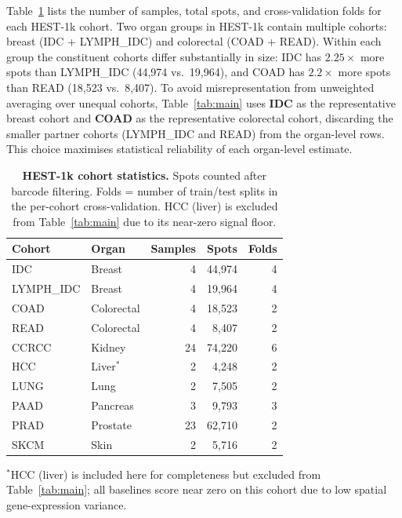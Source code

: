 \documentclass[10pt,twocolumn,letterpaper]{article}
\begin{document}
Table~\ref{tab:cohort_stats} lists the number of samples, total spots, and cross-validation folds
for each HEST-1k cohort.
Two organ groups in HEST-1k contain multiple cohorts: breast (IDC + LYMPH\_IDC) and
colorectal (COAD + READ).
Within each group the constituent cohorts differ substantially in size: IDC has $2.25\times$ more
spots than LYMPH\_IDC (44{,}974 vs.\ 19{,}964), and COAD has $2.2\times$ more spots than READ
(18{,}523 vs.\ 8{,}407).
To avoid misrepresentation from unweighted averaging over unequal cohorts, Table~\ref{tab:main}
uses \textbf{IDC} as the representative breast cohort and \textbf{COAD} as the representative
colorectal cohort, discarding the smaller partner cohorts (LYMPH\_IDC and READ) from the
organ-level rows. This choice maximises statistical reliability of each organ-level estimate.

\begin{table}[h]
\centering
\caption{\textbf{HEST-1k cohort statistics.} Spots counted after barcode filtering. Folds = number
of train/test splits in the per-cohort cross-validation. HCC (liver) is excluded from
Table~\ref{tab:main} due to its near-zero signal floor.}
\label{tab:cohort_stats}
\small
\begin{tabular}{l l r r r}
\toprule
Cohort & Organ & Samples & Spots & Folds \\
\midrule
IDC          & Breast      & 4 & 44{,}974 & 4 \\
LYMPH\_IDC   & Breast      & 4 & 19{,}964 & 4 \\
COAD         & Colorectal  & 4 & 18{,}523 & 2 \\
READ         & Colorectal  & 4 &  8{,}407 & 2 \\
CCRCC        & Kidney      & 24 & 74{,}220 & 6 \\
HCC          & Liver$^*$   &  2 &  4{,}248 & 2 \\
LUNG         & Lung        &  2 &  7{,}505 & 2 \\
PAAD         & Pancreas    &  3 &  9{,}793 & 3 \\
PRAD         & Prostate    & 23 & 62{,}710 & 2 \\
SKCM         & Skin        &  2 &  5{,}716 & 2 \\
\bottomrule
\end{tabular}
\begin{minipage}{\linewidth}
\vspace{2pt}
\footnotesize $^*$HCC (liver) is included here for completeness but excluded from
Table~\ref{tab:main}; all baselines score near zero on this cohort due to low spatial
gene-expression variance.
\end{minipage}
\end{table}

{\small

}
\end{document}

